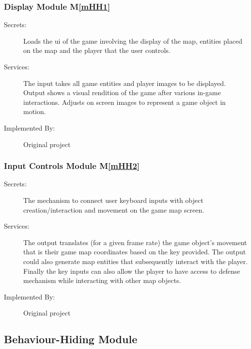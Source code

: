 \documentclass[12pt, titlepage]{article}
\newcommand{\mref}[1]{M\ref{#1}}
\begin{document}
\subsubsection{Display Module \mref{mHH1}}

\begin{description}
\item[Secrets:] Loads the ui of the game involving the display of the map, entities placed on the map and the player that the user controls. 
\item[Services:] The input takes all game entities and player images to be displayed. Output shows a visual rendition of the game after various in-game interactions. Adjusts on screen images to represent a game object in motion.
\item[Implemented By:] Original project
\end{description}

\subsubsection{Input Controls Module \mref{mHH2}}

\begin{description}
\item[Secrets:] The mechanism to connect user keyboard inputs with object creation/interaction and  movement on the game map screen.
\item[Services:] The output translates (for a given frame rate) the game object's movement that is their game map coordinates based on the key provided. The output could also generate map entities that subsequently interact with the player. Finally the key inputs can also allow the player to have access to defense mechanism while interacting with other map objects.
\item[Implemented By:] Original project
\end{description}

\subsection{Behaviour-Hiding Module}

\end{document}
